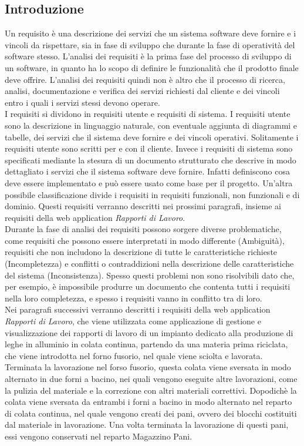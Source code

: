   \subsection{Introduzione}
  Un requisito è una descrizione dei servizi che un sistema software deve fornire e i vincoli 
  da rispettare, sia in fase di sviluppo che durante la fase di operatività del software stesso. 
  L'analisi dei requisiti è la prima fase del processo di sviluppo di un software, in quanto ha lo scopo di 
  definire le funzionalità che il prodotto finale deve offrire. L'analisi dei requisiti quindi non è altro che 
  il processo di ricerca, analisi, documentazione e verifica dei servizi richiesti dal cliente e dei vincoli entro 
  i quali i servizi stessi devono operare.\\
  I requisiti si dividono in requisiti utente e requisiti di sistema. I requisiti utente sono la descrizione 
  in linguaggio naturale, con eventuale aggiunta di diagrammi e tabelle, dei servizi che il sistema deve fornire e 
  dei vincoli operativi. Solitamente i requisiti utente sono scritti per e con il cliente. Invece i requisiti di sistema 
  sono specificati mediante la stesura di un documento strutturato che descrive in modo dettagliato i servizi che il 
  sistema software deve fornire. Infatti definiscono cosa deve essere implementato e può essere usato come 
  base per il progetto. Un'altra possibile classificazione divide i requisiti in requisiti funzionali, non funzionali e di dominio. 
  Questi requisiti verranno descritti nei prossimi paragrafi, insieme ai requisiti della web application \textit{Rapporti di Lavoro}.\\
  Durante la fase di analisi dei requisiti possono sorgere diverse problematiche, come requisiti che possono essere 
  interpretati in modo differente (Ambiguità), requisiti che non includono la descrizione di tutte le caratteristiche richieste (Incompletezza) e 
  conflitti o contraddizioni nella descrizione delle caratteristiche del sistema (Inconsistenza). Spesso questi problemi 
  non sono risolvibili dato che, per esempio, è impossibile produrre un documento che contenta tutti i requisiti nella loro completezza, e 
  spesso i requisiti vanno in conflitto tra di loro.\\
  Nei paragrafi successivi verranno descritti i requisiti della web application \textit{Rapporti di Lavoro}, che viene utilizzata 
  come applicazione di gestione e visualizzazione dei rapporti di lavoro di un impianto dedicato alla 
  produzione di leghe in alluminio in colata continua, partendo da una materia prima riciclata, che viene introdotta nel forno fusorio, 
  nel quale viene sciolta e lavorata. Terminata la lavorazione nel forso fusorio, questa colata viene sversata in modo alternato in due forni 
  a bacino, nei quali vengono eseguite altre lavorazioni, come la pulizia del materiale e la correzione con altri materiali correttivi. Dopodichè 
  la colata viene sversata da entrambi i forni a bacino in modo alternato nel reparto di colata continua, nel quale vengono creati dei pani, ovvero dei 
  blocchi costituiti dal materiale in lavorazione. Una volta terminata la lavorazione di questi pani, essi vengono conservati nel reparto Magazzino Pani. 

